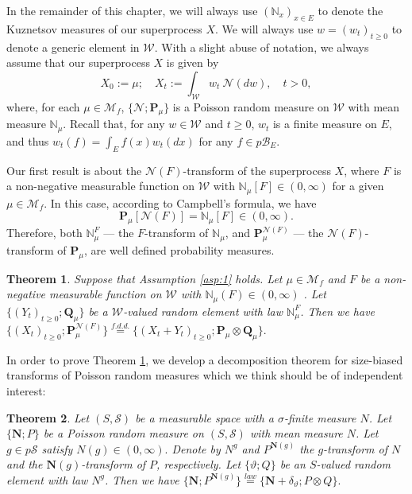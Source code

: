 \documentclass[UTF8]{pkuthss}
\theoremstyle{plain}
\newtheorem{thm}{Theorem}[section]
\theoremstyle{definition}
\numberwithin{equation}{section}
\begin{document}
In the remainder of this chapter, we will always use $(\mathbb N_x)_{x\in E}$ to denote the
Kuznetsov measures of our superprocess $X$.
We will always use $w = (w_t)_{t\geq 0}$ to denote a generic element in $\mathcal W$.
With a slight abuse of notation,
we always assume that our superprocess $X$ is given by
\[
	X_0 := \mu;
	\quad X_t
	:=\int_{\mathcal W}w_t~\mathcal N(dw),
	\quad t>0,
\]
	where, for each $\mu \in \mathcal M_f$, $\{\mathcal N; \mathbf P_\mu\}$ is a Poisson random measure on $\mathcal W$ with mean measure $\mathbb N_\mu$.
Recall that, for any $w\in \mathcal W$ and $t\geq 0$, $w_t$ is a finite measure on $E$, and thus $w_t(f)=\int_Ef(x)w_t(dx)$ for any $f \in p\mathscr B_E$.

Our first result is about the $\mathcal N(F)$-transform of the superprocess $X$, where $F$ is a non-negative measurable function on $\mathcal W$ with $\mathbb N_\mu[F] \in (0,\infty)$ for a given $\mu \in \mathcal M_f$. In this case, according to Campbell's formula, we have
\[
	\mathbf P_\mu[\mathcal N(F)]= \mathbb N_\mu[F] \in (0,\infty).
\]	
	Therefore, both $\mathbb N_\mu^F$ --- the $F$-transform of $\mathbb N_\mu$, and $\mathbf P_\mu^{\mathcal N(F)}$ --- the $\mathcal N(F)$-transform of $\mathbf P_\mu$, are well defined probability measures.
\begin{thm}\label{prop:sizBiasDecSupProc}
	Suppose that Assumption \ref{asp:1} holds.
Let $\mu \in \mathcal M_f$ and $F$ be a non-negative measurable function on $\mathcal W$ with $\mathbb N_\mu(F)\in (0,\infty)$ .
	Let $\{(Y_t)_{t\geq 0}; \mathbf Q_\mu\}$ be a $\mathcal W$-valued random element with
 law $\mathbb N^F_\mu$.
	Then we have
$
	\{(X_t)_{t\geq 0}; \mathbf P_\mu^{\mathcal N(F)}\}
	\overset{f.d.d.}{=} \{(X_t + Y_t)_{t\geq 0}; \mathbf P_\mu \otimes \mathbf Q_\mu\}.
$
\end{thm}
In order to prove Theorem \ref{prop:sizBiasDecSupProc},
	we develop a decomposition theorem for size-biased transforms of Poisson random measures which we think should be of independent interest:
\begin{thm}\label{prop:sizBaisPoissRandMeas}
	Let $(S, \mathscr S)$ be a measurable space with a $\sigma$-finite measure $N$.
	Let $\{\mathbf N; P\}$ be a Poisson random measure on $(S, \mathscr S)$
	with mean measure $N$.
	Let $g \in p \mathscr S$ satisfy $N(g)\in (0,\infty).$
	Denote by $N^g$ and $P^{\mathbf N(g)}$ the $g$-transform of $N$ and the $\mathbf N(g)$-transform of $P$, respectively.
	Let $\{\vartheta;Q\}$ be an $S$-valued random element
	with law $N^g$.
	Then we have
$
	\{\mathbf N;P^{\mathbf N(g)}\}
	\overset{law}{=} \{\mathbf N + \delta_\vartheta;P\otimes Q\}.
$
\end{thm}
\end{document}

